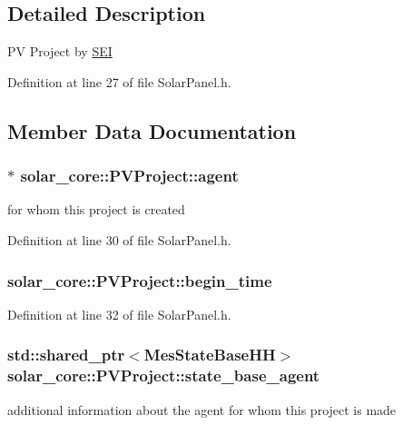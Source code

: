 \subsection{Detailed Description}
P\+V Project by \hyperlink{classsolar__core_1_1_s_e_i}{S\+E\+I} 

Definition at line 27 of file Solar\+Panel.\+h.



\subsection{Member Data Documentation}
\hypertarget{classsolar__core_1_1_p_v_project_a20e8115154979d2f856f1acceb6bb2b1}{}
\subsubsection[{agent}]{$\ast$ solar\+\_\+core\+::\+P\+V\+Project\+::agent}\label{classsolar__core_1_1_p_v_project_a20e8115154979d2f856f1acceb6bb2b1}
for whom this project is created 

Definition at line 30 of file Solar\+Panel.\+h.

\hypertarget{classsolar__core_1_1_p_v_project_a5b8869c2a2580e5183a7796580074555}{}
\subsubsection[{begin\+\_\+time}]{ solar\+\_\+core\+::\+P\+V\+Project\+::begin\+\_\+time}\label{classsolar__core_1_1_p_v_project_a5b8869c2a2580e5183a7796580074555}


Definition at line 32 of file Solar\+Panel.\+h.

\hypertarget{classsolar__core_1_1_p_v_project_a1a3576ddac7b82f9a2d7c139af9850d2}{}
\subsubsection[{state\+\_\+base\+\_\+agent}]{\setlength{\rightskip}{0pt plus 5cm}std\+::shared\+\_\+ptr$<${\bf Mes\+State\+Base\+H\+H}$>$ solar\+\_\+core\+::\+P\+V\+Project\+::state\+\_\+base\+\_\+agent}\label{classsolar__core_1_1_p_v_project_a1a3576ddac7b82f9a2d7c139af9850d2}
additional information about the agent for whom this project is made 

